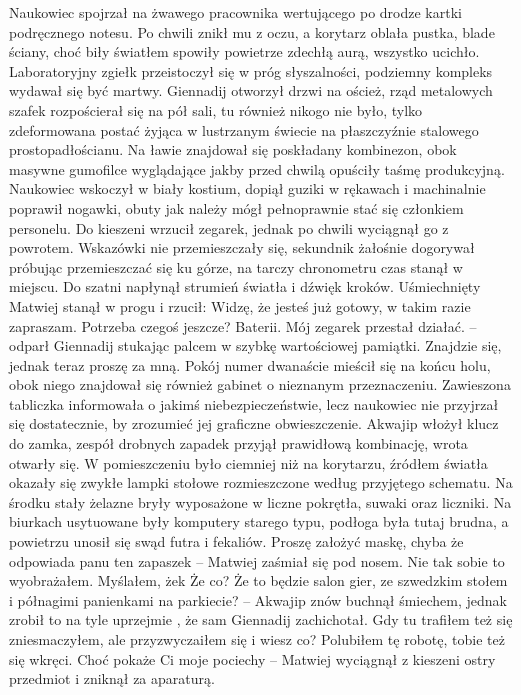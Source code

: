 \documentclass[../MAIN.tex]{subfiles}
\begin{document}
Naukowiec spojrzał na żwawego pracownika wertującego po drodze kartki podręcznego notesu. Po chwili znikł mu z oczu, a korytarz oblała pustka, blade ściany, choć biły światłem spowiły powietrze zdechłą aurą, wszystko ucichło. Laboratoryjny zgiełk przeistoczył się w próg słyszalności, podziemny kompleks wydawał się być martwy. Giennadij otworzył drzwi na oścież, rząd metalowych szafek rozpościerał się na pół sali, tu również nikogo nie było, tylko zdeformowana postać żyjąca w lustrzanym świecie na płaszczyźnie stalowego prostopadłościanu. Na ławie znajdował się poskładany kombinezon, obok masywne gumofilce wyglądające jakby przed chwilą opuściły taśmę produkcyjną. Naukowiec wskoczył w biały kostium, dopiął guziki w rękawach i machinalnie poprawił nogawki, obuty jak należy mógł pełnoprawnie stać się członkiem personelu. Do kieszeni wrzucił zegarek, jednak po chwili wyciągnął go z powrotem. Wskazówki nie przemieszczały się, sekundnik żałośnie dogorywał próbując przemieszczać się ku górze, na tarczy chronometru 
czas stanął w miejscu. Do szatni napłynął strumień światła i dźwięk kroków. Uśmiechnięty Matwiej stanął w progu i rzucił: 
% 
\sx Widzę, że jesteś już gotowy, w takim razie zapraszam. Potrzeba czegoś jeszcze? 
\xx Baterii. Mój zegarek przestał działać. -- odparł Giennadij stukając palcem w szybkę wartościowej pamiątki. 
\xx Znajdzie się, jednak teraz proszę za mną. 
\qd
Pokój numer dwanaście mieścił się na końcu holu, obok niego znajdował się również gabinet o nieznanym przeznaczeniu. Zawieszona tabliczka informowała o jakimś niebezpieczeństwie, lecz naukowiec nie przyjrzał się dostatecznie, by zrozumieć jej graficzne obwieszczenie. Akwajip włożył klucz do zamka, zespół drobnych zapadek przyjął prawidłową kombinację, wrota otwarły się. W pomieszczeniu było ciemniej niż na korytarzu, źródłem światła okazały się zwykłe lampki stołowe rozmieszczone według przyjętego schematu. Na środku stały żelazne bryły wyposażone w liczne pokrętła, suwaki oraz liczniki. Na biurkach usytuowane były komputery starego typu, podłoga była tutaj brudna, a powietrzu unosił się swąd futra i fekaliów. 
% 
\sx Proszę założyć maskę, chyba że odpowiada panu ten zapaszek -- Matwiej zaśmiał się pod nosem. 
\xx Nie tak sobie to wyobrażałem. Myślałem, że\3k 
\xx Że co? Że to będzie salon gier, ze szwedzkim stołem i półnagimi panienkami na parkiecie? -- Akwajip znów buchnął śmiechem, jednak zrobił to na tyle uprzejmie , że sam Giennadij zachichotał. 
\xx Gdy tu trafiłem też się zniesmaczyłem, ale przyzwyczaiłem się i wiesz co? Polubiłem tę robotę, tobie też się wkręci. Choć pokaże Ci moje pociechy -- Matwiej wyciągnął z kieszeni ostry przedmiot i zniknął za aparaturą. 
\end{document}
